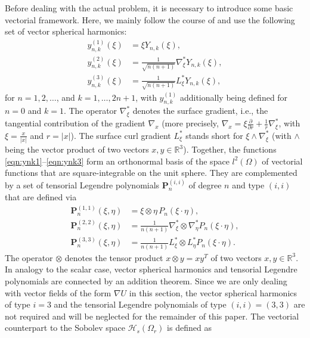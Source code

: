 \documentclass[a4paper, 10pt]{article}
\numberwithin{equation}{section}
\theoremstyle{definition}
\begin{document}
Before dealing with the actual problem, it is necessary to introduce some basic vectorial framework. Here, we mainly follow the course of \cite{freeschrei09} and use the following set of vector spherical harmonics:
\begin{align}
{y}_{n,k}^{(1)}\left(\xi\right)&=\xi Y_{n,k}\left(\xi\right),\label{eqn:ynk1}
\\{y}_{n,k}^{(2)}\left(\xi\right)&=\frac{1}{\sqrt{n(n+1)}}\nabla^*_{\xi}Y_{n,k}\left(\xi\right),
\\{y}_{n,k}^{(3)}\left(\xi\right)&=\frac{1}{\sqrt{n(n+1)}}L_{\xi}^*Y_{n,k}\left(\xi\right),\label{eqn:ynk3}
\end{align}
for $n=1,2,\ldots$, and $k=1,\ldots, 2n+1$, with ${y}_{n,k}^{(1)}$ additionally being defined for $n=0$ and $k=1$. The operator $\nabla^*_\xi$ denotes the surface gradient, i.e., the tangential contribution of the gradient $\nabla_x$ (more precisely, $\nabla_x=\xi\frac{\partial}{\partial{r}}+\frac{1}{r}\nabla^*_{\xi}$, with $\xi=\frac{x}{|x|}$ and $r=|x|$). The surface curl gradient $L^*_{\xi}$ stands short for $\xi\wedge\nabla_{\xi}^*$ (with $\wedge$ being the vector product of two vectors $x,y\in\mathbb{R}^3$). Together, the functions \eqref{eqn:ynk1}--\eqref{eqn:ynk3} form an orthonormal basis of the space $l^2(\Omega)$ of vectorial functions that are square-integrable on the unit sphere. They are complemented by a set of tensorial Legendre polynomials $\mathbf{P}^{(i,i)}_n$ of degree $n$ and type $(i,i)$ that are defined via
\begin{align}
\mathbf{P}^{(1,1)}_n\left(\xi,\eta\right)&=\xi\otimes\eta \,P_n\left(\xi\cdot\eta\right),
\\\mathbf{P}^{(2,2)}_n\left(\xi,\eta\right)&=\frac{1}{{n(n+1)}}\nabla^*_{\xi}\otimes\nabla^*_{\eta}P_n\left(\xi\cdot\eta\right),
\\\mathbf{P}^{(3,3)}_n\left(\xi,\eta\right)&=\frac{1}{{n(n+1)}}L^*_{\xi}\otimes L^*_{\eta}P_n\left(\xi\cdot\eta\right).
\end{align}
The operator $\otimes$ denotes the tensor product $x\otimes y=xy^T$ of two vectors $x,y\in\mathbb{R}^3$. In analogy to the scalar case, vector spherical harmonics and tensorial Legendre polynomials are connected by an addition theorem. Since we are only dealing with vector fields of the form $\nabla U$ in this section, the vector spherical harmonics of type $i=3$ and the tensorial Legendre polynomials of type $(i,i)=(3,3)$ are not required and will be neglected for the remainder of this paper. The vectorial counterpart to the Sobolev space $\mathcal{H}_s(\Omega_r)$ is defined as
\end{document}
